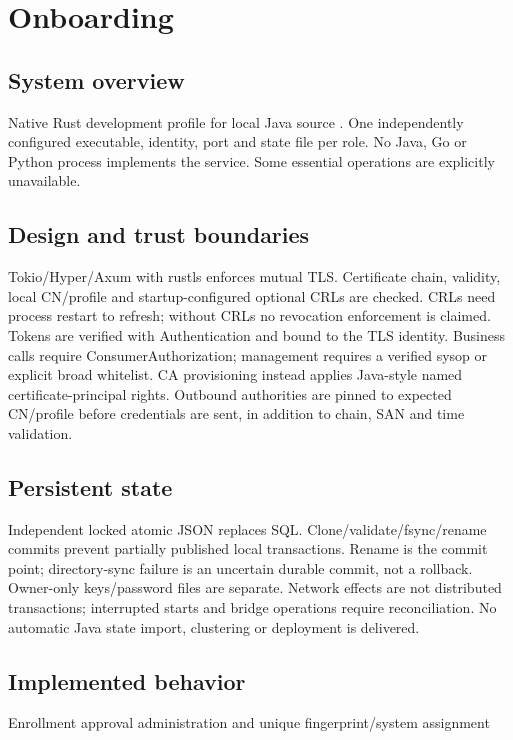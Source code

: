 \documentclass[a4paper]{arrowhead}
\begin{document}
\ArrowheadSetup
\section{Onboarding}
\subsection{System overview}
Native Rust development profile for local Java source . One independently configured executable, identity, port and state file per role. No Java, Go or Python process implements the service. Some essential operations are explicitly unavailable.
\subsection{Design and trust boundaries}
Tokio/Hyper/Axum with rustls enforces mutual TLS. Certificate chain, validity, local CN/profile and startup-configured optional CRLs are checked. CRLs need process restart to refresh; without CRLs no revocation enforcement is claimed. Tokens are verified with Authentication and bound to the TLS identity. Business calls require ConsumerAuthorization; management requires a verified sysop or explicit broad whitelist. CA provisioning instead applies Java-style named certificate-principal rights. Outbound authorities are pinned to expected CN/profile before credentials are sent, in addition to chain, SAN and time validation.
\subsection{Persistent state}
Independent locked atomic JSON replaces SQL. Clone/validate/fsync/rename commits prevent partially published local transactions. Rename is the commit point; directory-sync failure is an uncertain durable commit, not a rollback. Owner-only keys/password files are separate. Network effects are not distributed transactions; interrupted starts and bridge operations require reconciliation. No automatic Java state import, clustering or deployment is delivered.
\subsection{Implemented behavior}
Enrollment approval administration and unique fingerprint/system assignment
\end{document}
